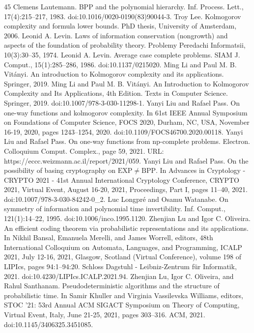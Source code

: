 \documentclass[10pt,a4paper]{article}
\begin{document}
\begin{thebibliography}{45}
 Clemens Lautemann. BPP and the polynomial hierarchy. Inf. Process. Lett., 17(4):215–217, 1983. doi:10.1016/0020-0190(83)90044-3.
 Troy Lee. Kolmogorov complexity and formula lower bounds. PhD thesis, University of Amsterdam, 2006.
 Leonid A. Levin. Laws of information conservation (nongrowth) and aspects of the foundation of probability theory. Problemy Peredachi Informatsii, 10(3):30–35, 1974.
 Leonid A. Levin. Average case complete problems. SIAM J. Comput., 15(1):285–286, 1986. doi:10.1137/0215020.
 Ming Li and Paul M. B. Vitányi. An introduction to Kolmogorov complexity and its applications. Springer, 2019.
 Ming Li and Paul M. B. Vitányi. An Introduction to Kolmogorov Complexity and Its Applications, 4th Edition. Texts in Computer Science. Springer, 2019. doi:10.1007/978-3-030-11298-1.
 Yanyi Liu and Rafael Pass. On one-way functions and kolmogorov complexity. In 61st IEEE Annual Symposium on Foundations of Computer Science, FOCS 2020, Durham, NC, USA, November 16-19, 2020, pages 1243–1254, 2020. doi:10.1109/FOCS46700.2020.00118.
 Yanyi Liu and Rafael Pass. On one-way functions from np-complete problems. Electron. Colloquium Comput. Complex., page 59, 2021. URL: https://eccc.weizmann.ac.il/report/2021/059.
 Yanyi Liu and Rafael Pass. On the possibility of basing cryptography on $\mathrm{EXP}\neq\mathrm{BPP}$. In Advances in Cryptology - CRYPTO 2021 - 41st Annual International Cryptology Conference, CRYPTO 2021, Virtual Event, August 16-20, 2021, Proceedings, Part I, pages 11–40, 2021. doi:10.1007/978-3-030-84242-0\_2.
 Luc Longpré and Osamu Watanabe. On symmetry of information and polynomial time invertibility. Inf. Comput., 121(1):14–22, 1995. doi:10.1006/inco.1995.1120.
 Zhenjian Lu and Igor C. Oliveira. An efficient coding theorem via probabilistic representations and its applications. In Nikhil Bansal, Emanuela Merelli, and James Worrell, editors, 48th International Colloquium on Automata, Languages, and Programming, ICALP 2021, July 12-16, 2021, Glasgow, Scotland (Virtual Conference), volume 198 of LIPIcs, pages 94:1–94:20. Schloss Dagstuhl - Leibniz-Zentrum für Informatik, 2021. doi:10.4230/LIPIcs.ICALP.2021.94.
 Zhenjian Lu, Igor C. Oliveira, and Rahul Santhanam. Pseudodeterministic algorithms and the structure of probabilistic time. In Samir Khuller and Virginia Vassilevska Williams, editors, STOC ’21: 53rd Annual ACM SIGACT Symposium on Theory of Computing, Virtual Event, Italy, June 21-25, 2021, pages 303–316. ACM, 2021. doi:10.1145/3406325.3451085.

\end{thebibliography}
\end{document}

